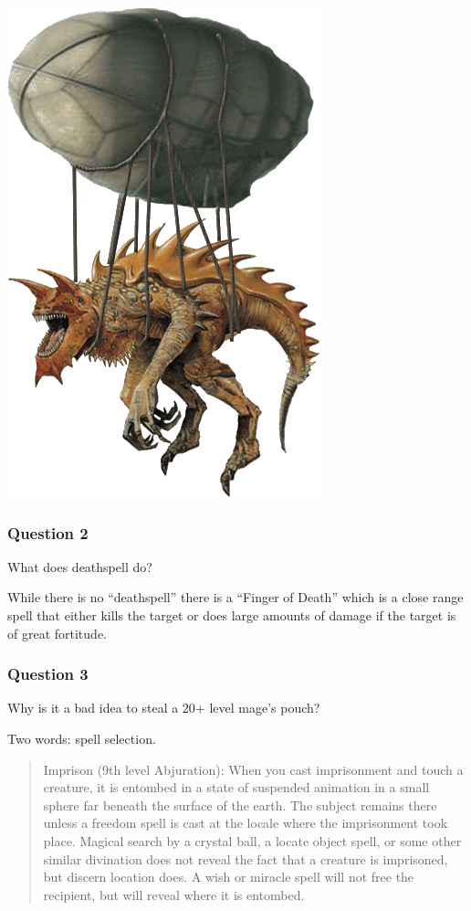 \documentclass{beamer}\usepackage{graphicx, color}
\begin{document}
\begin{frame}
  \begin{center}
    \includegraphics[height = \textheight, keepaspectratio = true]{tarrasque_2}
  \end{center}

\end{frame}

\begin{frame}
  \frametitle{Question 2}
  \Large{What does deathspell do?}

  While there is no ``deathspell'' there is a ``Finger of Death'' which is a close range spell that either kills the target or does large amounts of damage if the target is of great fortitude.

\end{frame}

\begin{frame}
  \frametitle{Question 3}
  \Large{Why is it a bad idea to steal a 20+ level mage's pouch?}

  Two words: spell selection.

  \small{
  \begin{quote}
  Imprison (9th level Abjuration): When you cast imprisonment and touch a creature, it is entombed in a state of suspended animation in a small sphere far beneath the surface of the earth. The subject remains there unless a freedom spell is cast at the locale where the imprisonment took place. Magical search by a crystal ball, a locate object spell, or some other similar divination does not reveal the fact that a creature is imprisoned, but discern location does. A wish or miracle spell will not free the recipient, but will reveal where it is entombed.
  \end{quote}
  }

\end{frame}
\end{document}
